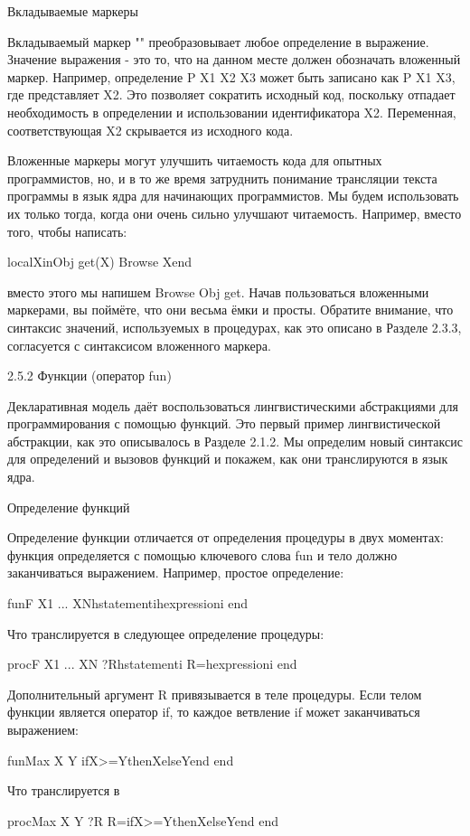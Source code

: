 Вкладываемые маркеры

Вкладываемый маркер "" преобразовывает любое определение в выражение. Значение выражения - это то, что на данном месте должен обозначать вложенный маркер. Например, определение {P X1 X2 X3} может быть записано как {P X1 X3}, где  представляет X2. Это позволяет сократить исходный код, поскольку отпадает необходимость в определении и использовании идентификатора X2. Переменная, соответствующая X2 скрывается из исходного кода.

Вложенные маркеры могут улучшить читаемость кода для опытных программистов, но, и в то же время затруднить понимание трансляции текста программы в язык ядра для начинающих программистов. Мы будем использовать их только тогда, когда они очень сильно улучшают читаемость. Например, вместо того, чтобы написать:

localXin{Obj get(X)} {Browse X}end

вместо этого мы напишем {Browse {Obj get{}}}. Начав пользоваться вложенными маркерами, вы поймёте, что они весьма ёмки и просты. Обратите внимание, что синтаксис значений, используемых в процедурах, как это описано в Разделе 2.3.3, согласуется с синтаксисом вложенного маркера.

2.5.2 Функции (оператор fun)

Декларативная модель даёт воспользоваться лингвистическими абстракциями для программирования с помощью функций. Это первый пример лингвистической абстракции, как это описывалось в Разделе 2.1.2. Мы определим новый синтаксис для определений и вызовов функций и покажем, как они транслируются в язык ядра.

Определение функций

Определение функции отличается от определения процедуры в двух моментах: функция определяется с помощью ключевого слова fun и тело должно заканчиваться выражением. Например, простое определение:

fun{F X1 ... XN}hstatementihexpressioni end

Что транслируется в следующее определение процедуры:

proc{F X1 ... XN ?R}hstatementi R=hexpressioni end

Дополнительный аргумент R привязывается в теле процедуры. Если телом функции является оператор if, то каждое ветвление if может заканчиваться выражением:

fun{Max X Y}
ifX>=YthenXelseYend
end

Что транслируется в

proc{Max X Y ?R}
R=ifX>=YthenXelseYend
end

